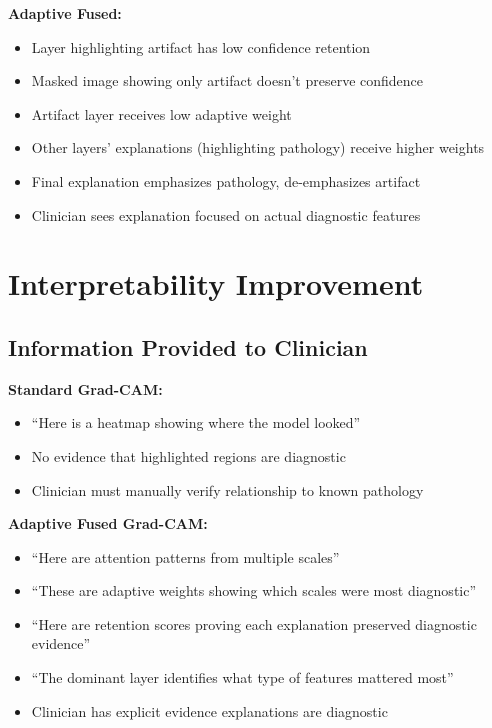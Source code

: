 \documentclass[12pt,a4paper,oneside]{book}
\begin{document}
\textbf{Adaptive Fused:}
\begin{itemize}
  \item Layer highlighting artifact has low confidence retention
  \item Masked image showing only artifact doesn't preserve confidence
  \item Artifact layer receives low adaptive weight
  \item Other layers' explanations (highlighting pathology) receive higher weights
  \item Final explanation emphasizes pathology, de-emphasizes artifact
  \item Clinician sees explanation focused on actual diagnostic features
\end{itemize}

\section{Interpretability Improvement}

\subsection{Information Provided to Clinician}

\textbf{Standard Grad-CAM:}
\begin{itemize}
  \item ``Here is a heatmap showing where the model looked''
  \item No evidence that highlighted regions are diagnostic
  \item Clinician must manually verify relationship to known pathology
\end{itemize}

\textbf{Adaptive Fused Grad-CAM:}
\begin{itemize}
  \item ``Here are attention patterns from multiple scales''
  \item ``These are adaptive weights showing which scales were most diagnostic''
  \item ``Here are retention scores proving each explanation preserved diagnostic evidence''
  \item ``The dominant layer identifies what type of features mattered most''
  \item Clinician has explicit evidence explanations are diagnostic
\end{itemize}

\end{document}
